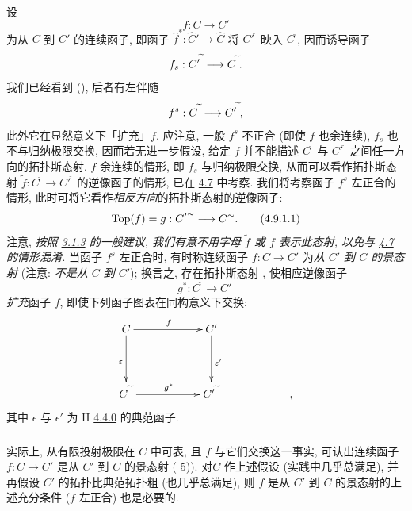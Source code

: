 \subsubsection{}
设
$$
f:C\longrightarrow C'
$$
为从 $C$ 到 $C'$ 的连续函子, 即函子 $\widehat{f}^{\ast}:\widehat{C}'\rightarrow\widehat{C}$ 将 ${C'}^{\widetilde{\phantom{,}}}$ 映入 $C^{\widetilde{\phantom{,}}}$, 因而诱导函子
$$
f_s:{C'}^{\widetilde{\phantom{,}}}\longrightarrow
C^{\widetilde{\phantom{,}}}{}.
$$
我们已经看到 (), 后者有左伴随
$$
f^s:C^{\widetilde{\phantom{,}}}\longrightarrow
{C'}^{\widetilde{\phantom{,}}}{},
$$
此外它在显然意义下「扩充」$f$. 应注意, 一般 $f^s$ 不正合 (即使 $f$ 也余连续), $f_s$ 也不与归纳极限交换, 因而若无进一步假设, 给定 $f$ 并不能描述 $C^{\widetilde{\phantom{,}}}$ 与 ${C'}^{\widetilde{\phantom{,}}}$ 之间任一方向的拓扑斯态射. $f$ 余连续的情形, 即 $f_s$ 与归纳极限交换, 从而\pageoriginale 可以看作拓扑斯态射 $\widetilde{f}:C^{\widetilde{\phantom{,}}}\rightarrow{C'}^{\widetilde{\phantom{,}}}$ 的逆像函子的情形, 已在 \hyperref[IV.subsec4.7]{4.7} 中考察. 我们将考察函子 $f^s$ 左正合的情形, 此时可将它看作\emph{相反方向}的拓扑斯态射的逆像函子:
\begin{equation*}
\operatorname{Top}(f)=g:{C'}^{\sim}\longrightarrow C^{\sim}{}. \tag{4.9.1.1}
\end{equation*}
注意, \emph{按照 \hyperref[IV.subsubsec3.1.3]{3.1.3} 的一般建议, 我们有意不用字母 $\widetilde{f}$ 或 $f$ 表示此态射, 以免与 \hyperref[IV.subsec4.7]{4.7} 的情形混淆.} 当函子 $f^s$ 左正合时, 有时称连续函子 $f:C\rightarrow C'$ 为\emph{从 $C'$ 到 $C$ 的景态射} (注意: \emph{不是从 $C$ 到 $C'$}); 换言之, 存在拓扑斯态射 , 使相应逆像函子
$$
g^{\ast}:C^{\widetilde{\phantom{,}}}\longrightarrow
{C'}^{\widetilde{\phantom{,}}}
$$
\emph{扩充}函子 $f$, 即使下列函子图表在同构意义下交换:
\[
\xymatrix@C=2cm@R=1.5cm{
C \ar[d]_{\epsilon} \ar[r]^{f}& C' \ar[d]^{{\epsilon}'}\\
C^{\widetilde{\phantom{a}}} \ar[r]^{g^{\ast}} &
C'^{\widetilde{\phantom{a}}} &, }
\]
其中 $\epsilon$ 与 $\epsilon'$ 为 II \hyperref[II.subsubsec4.4.0]{4.4.0} 的典范函子.

\subsubsection{}
实际上, 从有限投射极限在 $C$ 中可表, 且 $f$ 与它们交换这一事实, 可认出连续函子 $f:C\rightarrow C'$ 是从 $C'$ 到 $C$ 的景态射 ( 5)). 对\pageoriginale $C$ 作上述假设 (实践中几乎总满足), 并再假设 $C'$ 的拓扑比典范拓扑粗 (也几乎总满足), 则 $f$ 是从 $C'$ 到 $C$ 的景态射的上述充分条件 ($f$ 左正合) 也是必要的.

